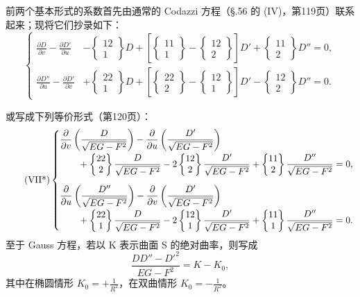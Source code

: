 前两个基本形式的系数首先由通常的 Codazzi 方程（\S.56 的 (IV)，第119页）联系起来；现将它们抄录如下：
\[
\tag{VII}
\left\{
\begin{aligned}
\frac{\partial D}{\partial v}-\frac{\partial D'}{\partial u}
&-\left\{\begin{matrix}12\\1\end{matrix}\right\}D
+\left[\left\{\begin{matrix}11\\1\end{matrix}\right\}
-\left\{\begin{matrix}12\\2\end{matrix}\right\}\right]D'
+\left\{\begin{matrix}11\\2\end{matrix}\right\}D''=0,\\
\frac{\partial D''}{\partial u}-\frac{\partial D'}{\partial v}
&+\left\{\begin{matrix}22\\1\end{matrix}\right\}D
+\left[\left\{\begin{matrix}22\\2\end{matrix}\right\}
-\left\{\begin{matrix}12\\1\end{matrix}\right\}\right]D'
-\left\{\begin{matrix}12\\2\end{matrix}\right\}D''=0.
\end{aligned}\right.
\]

或写成下列等价形式（第120页）：
\[
\tag{VII*}
\left\{
\begin{aligned}
&\frac{\partial}{\partial v}\left(\frac{D}{\sqrt{EG-F^2}}\right)
-\frac{\partial}{\partial u}\left(\frac{D'}{\sqrt{EG-F^2}}\right)
\pxChFourteenDisplayBreak
+\Ctwo{22}{2}\frac{D}{\sqrt{EG-F^2}}
-2\Ctwo{12}{2}\frac{D'}{\sqrt{EG-F^2}}
+\Ctwo{11}{2}\frac{D''}{\sqrt{EG-F^2}}=0,\\[0.6em]
&\frac{\partial}{\partial u}\left(\frac{D''}{\sqrt{EG-F^2}}\right)
-\frac{\partial}{\partial v}\left(\frac{D'}{\sqrt{EG-F^2}}\right)
\pxChFourteenDisplayBreak
+\Ctwo{22}{1}\frac{D}{\sqrt{EG-F^2}}
-2\Ctwo{12}{1}\frac{D'}{\sqrt{EG-F^2}}
+\Ctwo{11}{1}\frac{D''}{\sqrt{EG-F^2}}=0 .
\end{aligned}
\right.
\]
至于 Gauss 方程，若以 K 表示曲面 S 的绝对曲率，则写成
\[
\tag{VIII}
\frac{DD''-D'^2}{EG-F^2}=K-K_0,
\]
其中在椭圆情形 $K_0=+\frac1{R^2}$，在双曲情形 $K_0=-\frac1{R^2}$。

